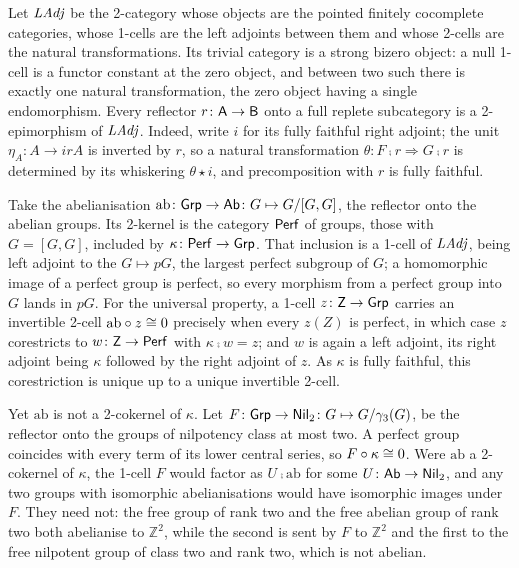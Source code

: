 \begin{example}[hypoabelianisation]
  \label{Ex Hypoabelianisation}
  Let \(\mathit{LAdj}\) be the 2-category whose objects are the pointed finitely cocomplete categories, whose 1-cells are the left adjoints between them and whose 2-cells are the natural transformations. Its trivial category is a strong bizero object: a null 1-cell is a functor constant at the zero object, and between two such there is exactly one natural transformation, the zero object having a single endomorphism. Every reflector \(r\colon\mathsf{A}\to\mathsf{B}\) onto a full replete subcategory is a 2-epimorphism of \(\mathit{LAdj}\). Indeed, write \(i\) for its fully faithful right adjoint; the unit \(\eta_{A}\colon A\to irA\) is inverted by \(r\), so a natural transformation \(\theta\colon F\comp r\Rightarrow G\comp r\) is determined by its whiskering \(\theta\star i\), and precomposition with \(r\) is fully faithful.

	Take the abelianisation \(\mathrm{ab}\colon\mathsf{Grp}\to\mathsf{Ab}\colon G\mapsto G/[G,G]\), the reflector onto the abelian groups. Its 2-kernel is the category \(\mathsf{Perf}\) of  groups, those with \(G=[G,G]\), included by \(\kappa\colon\mathsf{Perf}\to\mathsf{Grp}\). That inclusion is a 1-cell of \(\mathit{LAdj}\), being left adjoint to the  \(G\mapsto pG\), the largest perfect subgroup of \(G\); a homomorphic image of a perfect group is perfect, so every morphism from a perfect group into \(G\) lands in \(pG\). For the universal property, a 1-cell \(z\colon\mathsf{Z}\to\mathsf{Grp}\) carries an invertible 2-cell \(\mathrm{ab}\circ z\cong 0\) precisely when every \(z(Z)\) is perfect, in which case \(z\) corestricts to \(w\colon\mathsf{Z}\to\mathsf{Perf}\) with \(\kappa\comp w=z\); and \(w\) is again a left adjoint, its right adjoint being \(\kappa\) followed by the right adjoint of \(z\). As \(\kappa\) is fully faithful, this corestriction is unique up to a unique invertible 2-cell.

	Yet \(\mathrm{ab}\) is not a 2-cokernel of \(\kappa\). Let \(F\colon\mathsf{Grp}\to\mathsf{Nil}_{2}\colon G\mapsto G/\gamma_{3}(G)\), be the reflector onto the groups of nilpotency class at most two. A perfect group coincides with every term of its lower central series, so \(F\circ\kappa\cong 0\). Were \(\mathrm{ab}\) a 2-cokernel of \(\kappa\), the 1-cell \(F\) would factor as \(U\comp\mathrm{ab}\) for some \(U\colon\mathsf{Ab}\to\mathsf{Nil}_{2}\), and any two groups with isomorphic abelianisations would have isomorphic images under \(F\). They need not: the free group of rank two and the free abelian group of rank two both abelianise to \(\mathbb{Z}^{2}\), while the second is sent by \(F\) to \(\mathbb{Z}^{2}\) and the first to the free nilpotent group of class two and rank two, which is not abelian.


\end{example}
